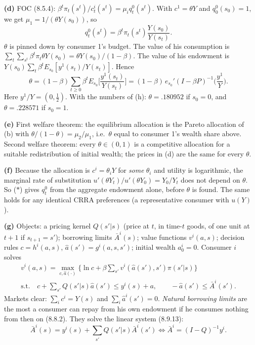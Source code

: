 \documentclass[12pt, letterpaper]{article}
\begin{document}
\begin{tcolorbox}[oddbox,title={Exercise 8.7 \quad Two consumers, Markov endowment}]
\textbf{(d)} FOC (8.5.4): $\beta^t\pi_t(s^t)/c^i_t(s^t)=\mu_iq^0_t(s^t)$. With $c^1=\theta Y$ and $q^0_0(s_0)=1$,
we get $\mu_1=1/(\theta Y(s_0))$, so
\[
\boxed{q^0_t(s^t)=\beta^t\pi_t(s^t)\frac{Y(s_0)}{Y(s_t)}.}
\]
$\theta$ is pinned down by consumer 1's budget. The value of his consumption is
$\sum_t\sum_{s^t}\beta^t\pi_t\theta Y(s_0)=\theta Y(s_0)/(1-\beta)$. The value of his endowment is
$Y(s_0)\sum_t\beta^tE_{s_0}[y^1(s_t)/Y(s_t)]$. Hence
\[
\theta=(1-\beta)\sum_{t\ge0}\beta^tE_{s_0}\Big[\frac{y^1(s_t)}{Y(s_t)}\Big]=(1-\beta)\,e_{s_0}'(I-\beta P)^{-1}\Big(\frac{y^1}{Y}\Big).
\]
Here $y^1/Y=(0,\tfrac12)$. With the numbers of (h): $\theta=.180952$ if $s_0=0$, and $\theta=.228571$ if $s_0=1$.

\textbf{(e)} First welfare theorem: the equilibrium allocation is the Pareto allocation of (b) with
$\theta/(1-\theta)=\mu_2/\mu_1$, i.e.\ $\theta$ equal to consumer 1's wealth share above. Second welfare theorem:
every $\theta\in(0,1)$ is a competitive allocation for a suitable redistribution of initial wealth; the prices
in (d) are the same for every $\theta$.

\textbf{(f)} Because the allocation is $c^i=\theta_iY$ for \emph{some} $\theta_i$ and utility is logarithmic, the
marginal rate of substitution $u'(\theta Y_t)/u'(\theta Y_0)=Y_0/Y_t$ does not depend on $\theta$. So
($\ast$) gives $q^0_t$ from the aggregate endowment alone, before $\theta$ is found. The same holds for any
identical CRRA preferences (a representative consumer with $u(Y)$).

\textbf{(g)} Objects: a pricing kernel $Q(s'|s)$ (price at $t$, in time-$t$ goods, of one unit at $t+1$ if
$s_{t+1}=s'$); borrowing limits $\bar A^i(s)$; value functions $v^i(a,s)$; decision rules
$c=h^i(a,s)$, $\hat a(s')=g^i(a,s,s')$; initial wealth $a^i_0=0$. Consumer $i$ solves
\begin{gather*}
v^i(a,s)=\max_{c,\hat a(\cdot)}\Big\{\ln c+\beta\sum_{s'}v^i(\hat a(s'),s')\pi(s'|s)\Big\}\\
\text{s.t.}\quad c+\sum_{s'}Q(s'|s)\hat a(s')\le y^i(s)+a,\qquad -\hat a(s')\le\bar A^i(s').
\end{gather*}
Markets clear: $\sum_ic^i=Y(s)$ and $\sum_i\hat a^i(s')=0$. \emph{Natural borrowing limits} are the most a
consumer can repay from his own endowment if he consumes nothing from then on (8.8.2). They solve the
linear system (8.9.13):
\[
\bar A^i(s)=y^i(s)+\sum_{s'}Q(s'|s)\bar A^i(s')\iff\bar A^i=(I-Q)^{-1}y^i .
\]


\end{tcolorbox}
\end{document}
